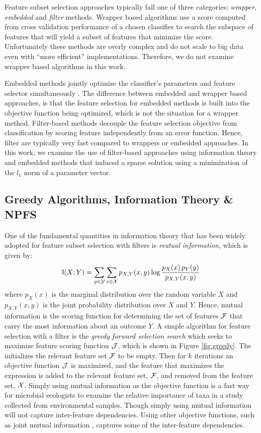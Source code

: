 \documentclass{acm_proc_article-sp}
\begin{document}
Feature subset selection approaches typically fall one of three categories: {\em wrapper}, {\em embedded} and {\em filter} methods. Wrapper based algorithms use a score computed from cross validation performance of a chosen classifier to search the subspace of features that will yield a subset of features that minimize the score. Unfortunately these methods are overly complex and do not scale to big data even with ``more efficient'' implementations. Therefore, we do not examine wrapper based algorithms   in this work. 

Embedded methods jointly optimize the  classifier's parameters and feature selector simultaneously \cite{Guyon2006Book, Guyon2003JMLR}. The difference between embedded and wrapper based approaches, is that the feature selection for embedded methods is built into the objective function being optimized, which is not the situation for a wrapper method. Filter-based methods decouple the feature selection objective from classification by scoring feature independently from an error function. Hence, filter are typically very fast compared to wrappers or embedded approaches. In this work, we examine the use of filter-based approaches using information theory and embedded methods that induced a sparse solution using a minimization of the $l_1$ norm of a parameter vector. 


\subsection{Greedy Algorithms, Information Theory \& NPFS}
\label{sec:greed}
One of the fundamental quantities in information theory that has been widely adopted for feature subset selection with filters is {\em mutual information}, which is given by:
\begin{align}
  \textsf{I}(X;Y) = \sum_{y\in{\mathcal Y}}\sum_{x\in{\mathcal X}} p_{X,Y}(x,y) \log \frac{p_X(x)\,p_Y(y)}{p_{X,Y}(x,y)}
  \label{eq:mi}
\end{align}
where $p_X(x)$ is the marginal distribution over the random variable $X$ and $p_{X,Y}(x,y)$ is the joint probability distribution over $X$ and $Y$. Hence, mutual information is the scoring function for determining the set of features ${\mathcal F}$ that carry the most information about an outcome $Y$. A simple algorithm for feature selection with a filter is the {\sl greedy forward selection search} which seeks to maximize feature scoring function ${\mathcal J}$, which is shown in Figure \ref{fig:greedy}. The initializes the relevant feature set ${\mathcal F}$ to be empty. Then for $k$ iterations an objective function ${\mathcal J}$ is maximized, and the feature that maximizes the expression is added to the relevant feature set, ${\mathcal F}$, and removed from the feature set, ${\mathcal X}$. Simply using mutual information as the objective function is a fast way for microbial ecologists to examine the relative importance of taxa in a study collected from environmental samples. Though simply using mutual information will not capture inter-feature dependencies. Using other objective functions, such as joint mutual information \cite{Yang1999NIPS}, captures some of the inter-feature dependencies.
\end{document}
